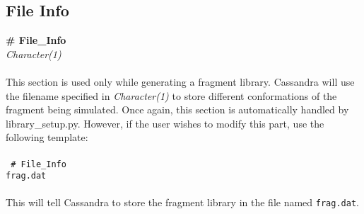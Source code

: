 {{{%
%
%
\subsection{File Info}\label{sec:File_Info}
{\bf \# File\_Info } \\
{\it Character(1)} \\ \\
%
This section is used only while generating a fragment library. Cassandra will use the filename
specified in {\it Character(1)} to store different conformations of the fragment being simulated. Once again, this
section is automatically handled by library\_setup.py. However, if the user wishes to modify this part, 
use the following template: \\ \\
%
\texttt{
\# File\_Info \\ 
frag.dat \\ \\}
%
This will tell Cassandra to store the fragment library in the file named \texttt{frag.dat}.
%
%
%
}}}

